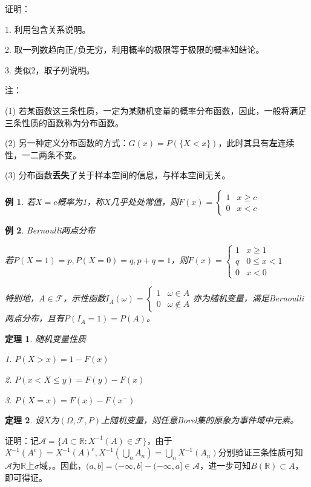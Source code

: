 \documentclass[a4paper,UTF8,fontset=windows]{ctexart}
\newtheorem{thm}{定理}[section]
\newtheorem{exmp}{例}[section]
\begin{document}
证明：

1. 利用包含关系说明。

2. 取一列数趋向正/负无穷，利用概率的极限等于极限的概率知结论。

3. 类似2，取子列说明。

注：

(1) 若某函数这三条性质，一定为某随机变量的概率分布函数，因此，一般将满足三条性质的函数称为分布函数。

(2) 另一种定义分布函数的方式：$G(x)=P(\{X<x\})$，此时其具有\textbf{左}连续性，一二两条不变。

(3) 分布函数\textbf{丢失}了关于样本空间的信息，与样本空间无关。

\begin{exmp}
若$X=c$概率为1，称$X$几乎处处常值，则$F(x)=\begin{cases}1&x\ge c\\0&x<c\end{cases}$
\end{exmp}

\begin{exmp} Bernoulli两点分布
	
若$P(X=1)=p,P(X=0)=q,p+q=1$，则$F(x)=\begin{cases}1&x\ge1\\q&0\le x<1\\0&x<0\end{cases}$

特别地，$A\in\mathcal{F}$，示性函数$I_A(\omega)=\begin{cases}1&\omega\in A\\0&\omega\notin A\end{cases}$亦为随机变量，满足Bernoulli两点分布，且有$P(I_A=1)=P(A)$。
\end{exmp}

\begin{thm} 随机变量性质

1. $P(X>x)=1-F(x)$

2. $P(x<X\le y)=F(y)-F(x)$

3. $P(X=x)=F(x)-F(x^-)$
\end{thm}

\begin{thm}
设$X$为$(\Omega,\mathcal{F},P)$上随机变量，则任意Borel集的原象为事件域中元素。
\end{thm}

证明：记$\mathcal{A}=\{A\subset\mathbb{R}:X^{-1}(A)\in\mathcal{F}\}$，由于$X^{-1}(A^\mathrm{c})=X^{-1}(A)^\mathrm{c},X^{-1}\left(\bigcup_nA_n\right)=\bigcup_nX^{-1}(A_n)$分别验证三条性质可知$\mathcal{A}$为$\mathbb{R}$上$\sigma$域，。因此，$(a,b]=(-\infty,b]-(-\infty,a]\in\mathcal{A}$，进一步可知$B(\mathbb{R})\subset A$，即可得证。
\end{document}
